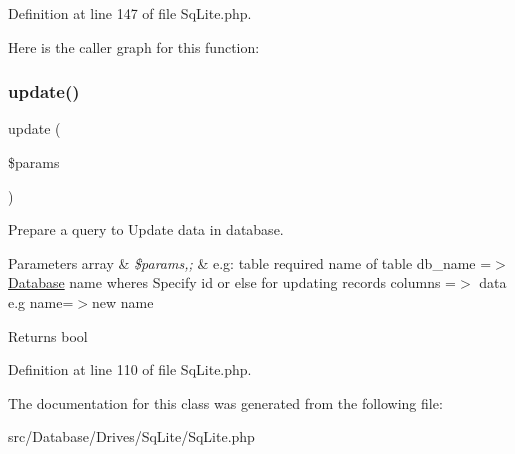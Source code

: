 Definition at line 147 of file Sq\+Lite.\+php.

Here is the caller graph for this function\+:
\mbox{\label{class_zest_1_1_database_1_1_drives_1_1_sq_lite_1_1_sq_lite_aacfc8ca52b10f139be3398f374cd01cb}} 
\subsubsection{\texorpdfstring{update()}{update()}}
{\footnotesize\ttfamily update (\begin{DoxyParamCaption}\item[{}]{\$params }\end{DoxyParamCaption})}

Prepare a query to Update data in database.


\begin{DoxyParams}[1]{Parameters}
array & {\em \$params,;} & e.\+g\+: \textquotesingle{}table\textquotesingle{} required name of table \textquotesingle{}db\+\_\+name\textquotesingle{} =$>$ \mbox{\hyperlink{namespace_zest_1_1_database}{Database}} name \textquotesingle{}wheres\textquotesingle{} Specify id or else for updating records \textquotesingle{}columns\textquotesingle{} =$>$ data e.\+g name=$>$new name\\
\hline
\end{DoxyParams}
\begin{DoxyReturn}{Returns}
bool 
\end{DoxyReturn}


Definition at line 110 of file Sq\+Lite.\+php.



The documentation for this class was generated from the following file\+:\begin{DoxyCompactItemize}
\item 
src/\+Database/\+Drives/\+Sq\+Lite/Sq\+Lite.\+php\end{DoxyCompactItemize}
